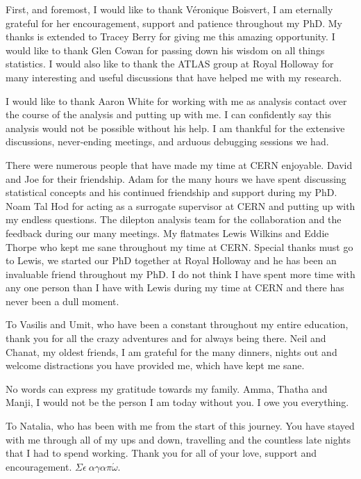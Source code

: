 \cleardoublepage{}
\begin{acknowledgements}
    First, and foremost, I would like to thank V\'{e}ronique Boisvert, I am eternally grateful for her encouragement, support and patience throughout my PhD. My thanks is extended to Tracey Berry for giving me this amazing opportunity. I would like to thank Glen Cowan for passing down his wisdom on all things statistics. I would also like to thank the ATLAS group at Royal Holloway for many interesting and useful discussions that have helped me with my research.

    I would like to thank Aaron White for working with me as analysis contact over the course of the analysis and putting up with me. I can confidently say this analysis would not be possible without his help. I am thankful for the extensive discussions, never-ending meetings, and arduous debugging sessions we had. 
    
    There were numerous people that have made my time at CERN enjoyable. David and Joe for their friendship. Adam for the many hours we have spent discussing statistical concepts and his continued friendship and support during my PhD. Noam Tal Hod for acting as a surrogate supervisor at CERN and putting up with my endless questions. The dilepton analysis team for the collaboration and the feedback during our many meetings. My flatmates Lewis Wilkins and Eddie Thorpe who kept me sane throughout my time at CERN. Special thanks must go to Lewis, we started our PhD together at Royal Holloway and he has been an invaluable friend throughout my PhD. I do not think I have spent more time with any one person than I have with Lewis during my time at CERN and there has never been a dull moment. 
    
    To Vasilis and Umit, who have been a constant throughout my entire education, thank you for all the crazy adventures and for always being there. Neil and Chanat, my oldest friends, I am grateful for the many dinners, nights out and welcome distractions you have provided me, which have kept me sane. 

    No words can express my gratitude towards my family. Amma, Thatha and Manji, I would not be the person I am today without you. I owe you everything. 

    To Natalia, who has been with me from the start of this journey. You have stayed with me through all of my ups and down, travelling and the countless late nights that I had to spend working. Thank you for all of your love, support and encouragement. $\Sigma\epsilon~ \alpha\gamma\alpha\pi\acute{\omega}$.
    
\end{acknowledgements}

\cleardoublepage{}\tableofcontents
\cleardoublepage{}\listoffigures
\cleardoublepage{}\listoftables

\dedication{In memory of Sudheera Nanayakkara (Ammi)}

